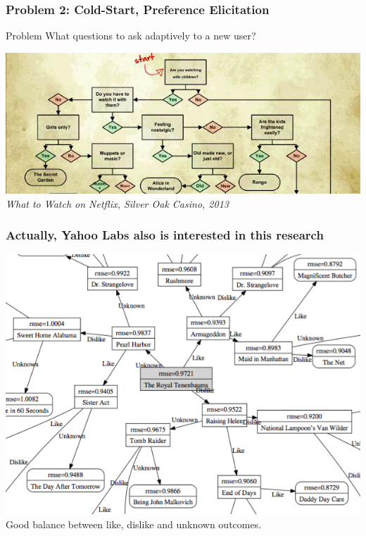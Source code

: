 \documentclass[]{beamer}
\begin{document}
\begin{frame}
  \frametitle{Problem 2: Cold-Start, Preference Elicitation}
  \begin{block}{Problem}
      What questions to ask adaptively to a new user?
  \end{block}
  \centering
  \includegraphics[width=\linewidth]{figures/flowchart.png}\\
  \em What to Watch on Netflix, Silver Oak Casino, 2013
\end{frame}

\begin{frame}
  \frametitle{Actually, Yahoo Labs also is interested in this research}
  \centering
  \includegraphics[width=0.9\linewidth]{figures/decisiontree.png}\\
  Good balance between like, dislike and unknown outcomes.
\end{frame}
\end{document}
